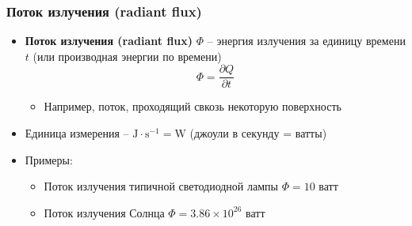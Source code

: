 \documentclass[10pt]{beamer}
\begin{document}
\begin{frame}
\frametitle{Поток излучения (radiant flux)}
\begin{itemize}
\item \textbf{Поток излучения (radiant flux)} \begin{math}\Phi\end{math} -- энергия излучения за единицу времени \begin{math}t\end{math} (или производная энергии по времени)
\begin{equation*}
\Phi = \frac{\partial Q}{\partial t}
\end{equation*}
\pause
\begin{itemize}
\item Например, поток, проходящий свкозь некоторую поверхность
\end{itemize}
\pause
\item Единица измерения -- \begin{math}\text{J}\cdot \text{s}^{-1} = \text{W}\end{math} (джоули в секунду = ватты)
\pause
\item Примеры:
\begin{itemize}
\item Поток излучения типичной светодиодной лампы \begin{math}\Phi = 10\end{math} ватт
\pause
\item Поток излучения Солнца \begin{math}\Phi = 3.86 \times 10^{26}\end{math} ватт
\end{itemize}
\end{itemize}
\end{frame}
\end{document}
